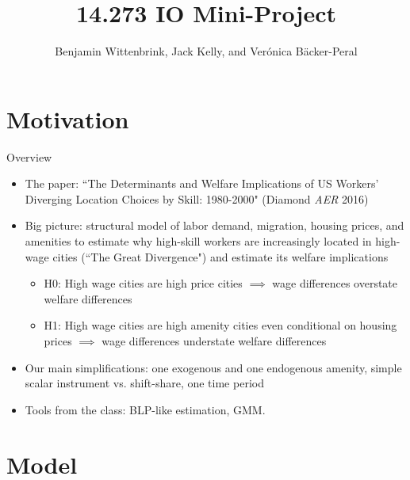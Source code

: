 \documentclass{beamer}
\title{14.273 IO Mini-Project}
\author{Benjamin Wittenbrink, Jack Kelly, and Verónica Bäcker-Peral}
\begin{document}
\maketitle

\section{Motivation}

\begin{frame}{Overview}
\begin{itemize}
\item The paper: ``The Determinants and Welfare Implications of US Workers' Diverging Location Choices by Skill: 1980-2000" (Diamond \textit{AER} 2016)
\item Big picture: structural model of labor demand, migration, housing prices, and amenities to estimate why high-skill workers are increasingly located in high-wage cities (``The Great Divergence") and estimate its welfare implications
    \begin{itemize}
    \item H0: High wage cities are high price cities $\implies$ wage differences overstate welfare differences 
    \item H1: High wage cities are high amenity cities even conditional on housing prices $\implies$ wage differences understate welfare differences
    \end{itemize}

    \item Our main simplifications:  one exogenous and one endogenous amenity, simple scalar instrument vs. shift-share, one time period 

    \item Tools from the class: BLP-like estimation, GMM.

\end{itemize}
\end{frame}

\section{Model}

\end{document}
